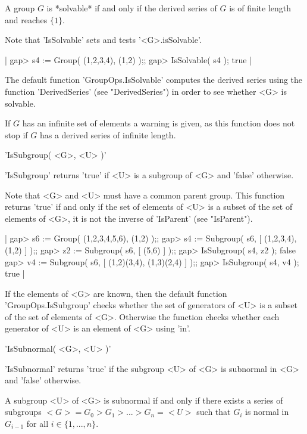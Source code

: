 A group $G$ is *solvable* if and only if the derived series of  $G$ is of
finite length and reaches $\{1\}$.

Note that 'IsSolvable' sets and tests '<G>.isSolvable'.

|    gap> s4 := Group( (1,2,3,4), (1,2) );;
    gap> IsSolvable( s4 );
    true |

The default  function 'GroupOps.IsSolvable' computes  the  derived series
using the function 'DerivedSeries' (see "DerivedSeries")  in order to see
whether <G> is solvable.

If  $G$ has  an infinite set   of elements a   warning is given,  as this
function does not stop if $G$ has a derived series of infinite length.


'IsSubgroup( <G>, <U> )'

'IsSubgroup'  returns 'true' if   <U> is a  subgroup of  <G> and  'false'
otherwise.

Note  that <G> and  <U>  must have a common   parent group. This function
returns 'true' if and only if the set of elements of <U>  is  a subset of
the set of  elements  of <G>, it  is not the  inverse of 'IsParent'  (see
"IsParent").

|    gap> s6  := Group( (1,2,3,4,5,6), (1,2) );;
    gap> s4 := Subgroup( s6, [ (1,2,3,4), (1,2) ] );;
    gap> z2 := Subgroup( s6, [ (5,6) ] );;
    gap> IsSubgroup( s4, z2 );
    false
    gap> v4 := Subgroup( s6, [ (1,2)(3,4), (1,3)(2,4) ] );;
    gap> IsSubgroup( s4, v4 );
    true |

If  the   elements  of  <G>  are   known,  then   the   default  function
'GroupOps.IsSubgroup' checks  whether  the set of generators of <U> is  a
subset of the set of  elements  of  <G>.   Otherwise the  function checks
whether each generator of <U> is an element of <G> using 'in'.


'IsSubnormal( <G>, <U> )'

'IsSubnormal' returns 'true' if the subgroup <U> of <G> is subnormal in
<G> and 'false' otherwise.

A subgroup <U> of <G> is subnormal if and  only  if there exists a series
of subgroups $<G> =  G_0 > G_1 >  ...  >  G_n  = <U>$ such  that $G_i$ is
normal in $G_{i-1}$ for all $i\in\{1, ..., n\}$.

